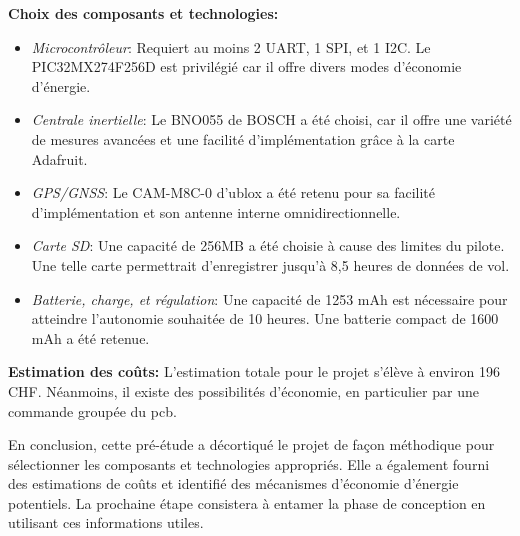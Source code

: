 \textbf{Choix des composants et technologies:}
\begin{itemize}
	\item \textit{Microcontrôleur}: Requiert au moins 2 UART, 1 SPI, et 1 I2C. Le PIC32MX274F256D est privilégié car il offre divers modes d'économie d'énergie.
	\item \textit{Centrale inertielle}: Le BNO055 de BOSCH a été choisi, car il offre une variété de mesures avancées et une facilité d'implémentation grâce à la carte Adafruit.
	\item \textit{GPS/GNSS}: Le CAM-M8C-0 d'ublox a été retenu pour sa facilité d'implémentation et son antenne interne omnidirectionnelle.
	\item \textit{Carte SD}: Une capacité de 256MB a été choisie à cause des limites du pilote. Une telle carte permettrait d'enregistrer jusqu'à 8,5 heures de données de vol.
	\item \textit{Batterie, charge, et régulation}: Une capacité de 1253 mAh est nécessaire pour atteindre l'autonomie souhaitée de 10 heures. Une batterie compact de 1600 mAh a été retenue.
\end{itemize}

\textbf{Estimation des coûts:}
L'estimation totale pour le projet s'élève à environ 196 CHF. Néanmoins, il existe des possibilités d'économie, en particulier par une commande groupée du \gls{pcb}.

En conclusion, cette pré-étude a décortiqué le projet de façon méthodique pour sélectionner les composants et technologies appropriés. Elle a également fourni des estimations de coûts et identifié des mécanismes d'économie d'énergie potentiels. La prochaine étape consistera à entamer la phase de conception en utilisant ces informations utiles.
